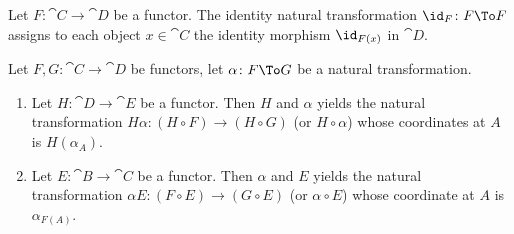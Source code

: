 \begin{example}
Let $F\colon\cat{C}\to\cat{D}$ be a functor. The identity natural
transformation $\id_{F}\colon F\To F$ assigns to each object
$x\in\cat{C}$ the identity morphism $\id_{F(x)}$ in $\cat{D}$.
\end{example}

\begin{definition}[Whiskering]
Let $F,G\colon\cat{C}\to\cat{D}$ be functors, let $\alpha\colon F\To G$
be a natural transformation.
\begin{enumerate}
\item Let $H\colon\cat{D}\to\cat{E}$ be a functor. Then
 $H$ and $\alpha$ yields the natural transformation
$H\alpha\colon(H\circ F)\to(H\circ G)$ (or $H\circ\alpha$) whose
coordinates at $A$ is $H(\alpha_{A})$.
\item Let $E\colon\cat{B}\to\cat{C}$ be a functor. Then
 $\alpha$ and $E$ yields the natural transformation
$\alpha E\colon(F\circ E)\to(G\circ E)$ (or $\alpha\circ E$) whose
coordinate at $A$ is $\alpha_{F(A)}$. 
\end{enumerate}
\end{definition}